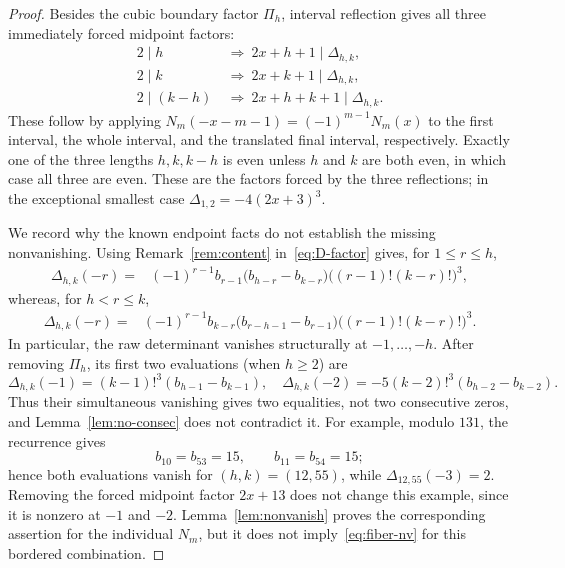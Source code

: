 \begin{proof}
Besides the cubic boundary factor $\Pi_h$, interval reflection gives all
three immediately forced midpoint factors:
\begin{equation}
 \begin{aligned}
 2\mid h     &\ \Longrightarrow\ 2x+h+1\mid\Delta_{h,k},\\
 2\mid k     &\ \Longrightarrow\ 2x+k+1\mid\Delta_{h,k},\\
 2\mid(k-h)  &\ \Longrightarrow\ 2x+h+k+1\mid\Delta_{h,k}.
 \end{aligned}                                                   \label{eq:midpoint-factors}
\end{equation}
These follow by applying
$N_m(-x-m-1)=(-1)^{m-1}N_m(x)$ to the first interval, the whole
interval, and the translated final interval, respectively.  Exactly one
of the three lengths $h,k,k-h$ is even unless $h$ and $k$ are both even,
in which case all three are even.  These are the factors forced by the
three reflections; in the exceptional smallest case
$\Delta_{1,2}=-4(2x+3)^3$.

We record why the known endpoint facts do not establish the missing
nonvanishing.  Using Remark~\ref{rem:content} in~\eqref{eq:D-factor}
gives, for $1\leq r\leq h$,
\begin{align}
 \Delta_{h,k}(-r)
  ={}&(-1)^{r-1}b_{r-1}\bigl(b_{h-r}-b_{k-r}\bigr)
       \bigl((r-1)!(k-r)!\bigr)^3,             \label{eq:Delta-left}
\end{align}
whereas, for $h<r\leq k$,
\begin{align}
 \Delta_{h,k}(-r)
  ={}&(-1)^{r-1}b_{k-r}\bigl(b_{r-h-1}-b_{r-1}\bigr)
       \bigl((r-1)!(k-r)!\bigr)^3.             \label{eq:Delta-right}
\end{align}
In particular, the raw determinant vanishes structurally at
$-1,\ldots,-h$.  After removing $\Pi_h$, its first two evaluations
(when $h\geq2$) are
\[
 \Delta_{h,k}(-1)=(k-1)!^3(b_{h-1}-b_{k-1}),
 \quad
 \Delta_{h,k}(-2)=-5(k-2)!^3(b_{h-2}-b_{k-2}).
\]
Thus their simultaneous vanishing gives two equalities, not two
consecutive zeros, and Lemma~\ref{lem:no-consec} does not contradict it.
For example, modulo $131$, the recurrence gives
\[
 b_{10}=b_{53}=15,\qquad b_{11}=b_{54}=15;
\]
hence both evaluations vanish for $(h,k)=(12,55)$, while
$\Delta_{12,55}(-3)=2$.  Removing the forced midpoint factor
$2x+13$ does not change this example, since it is nonzero at $-1$ and
$-2$.  Lemma~\ref{lem:nonvanish} proves the corresponding assertion for
the individual $N_m$, but it does not imply~\eqref{eq:fiber-nv} for this
bordered combination.


\end{proof}
